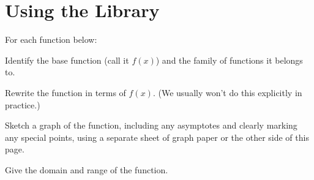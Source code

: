 \section*{Using the Library}
For each function below:
\begin{clist}
\item Identify the base function (call it $f(x)$) and the family of functions it belongs to.
\item Rewrite the function in terms of $f(x)$. (We usually won't do this explicitly in practice.)
\item Sketch a graph of the function, including any asymptotes and clearly marking any special points, using a separate sheet of graph paper or the other side of this page.
\item Give the domain and range of the function.
\end{clist}
